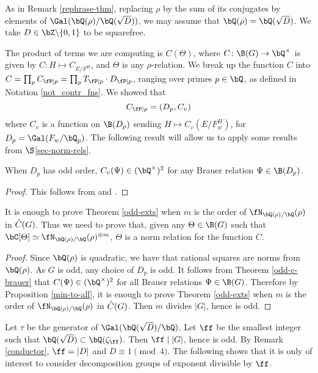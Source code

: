 As in Remark \ref{rephrase-thm}, replacing $\rho$ by the sum of its conjugates by elements of $ \Gal(\bQ(\rho) / \bQ(\sqrt{D}))$, we may assume that $\bQ(\rho) = \bQ(\sqrt{D})$. We take $D \in \bZ \backslash \{0,1 \}$ to be squarefree.

The product of terms we are computing is $C(\Theta)$, where $C \colon \B(G) \to \bQ^{\times}$ is given by $C \colon H \mapsto C_{E / F^H}$, and $\Theta$ is any $\rho$-relation.
We break up the function $C$ into $C = \prod_p C_{\fP \mid p} = \prod_p T_{\fP \mid p} \cdot D_{\fP \mid p}$, ranging over primes $p \in \bQ$,
as defined in Notation \ref{not_contr_fns}.
We showed that
\begin{equation*}\label{Dp-loc}
C_{\fP \mid p} = (D_p, C_v)
\end{equation*}
where $C_v$ is a function on $\B(D_p)$ sending $H \mapsto C_v(E / F_w^H)$, for $D_p = \Gal(F_w / \bQ_p)$. The following result will allow us to apply some results from $\S$\ref{sec-norm-rels}.

\begin{thm}\label{odd-c-brauer}
    When $D_p$ has odd order, $C_v(\Psi) \in (\bQ^{\times})^2$ for any Brauer relation $\Psi \in \B(D_p)$. 
\end{thm}

\begin{proof}
    This follows from \cite[Theorem 2.47]{reg-const} and \cite[Theorem 3.2  (Tam)]{reg-const}.
\end{proof}

\begin{cor}
It is enough to prove Theorem \ref{odd-exts} when $m$ is the order of $\repnorm{\rho}$ in $\hat{C}(G)$. Thus we need to prove that, given any $
\Theta \in \B(G)$ such that $\bC[\Theta] \simeq \repnorm{\rho}^{\oplus m}$, $\Theta$ is a norm relation for the function $C$. 
\end{cor}

\begin{proof}
    Since $\bQ(\rho)$ is quadratic, we have that rational squares are norms from $\bQ(\rho)$. As $G$ is odd, any choice of $D_p$ is odd. It follows from Theorem \ref{odd-c-brauer} that $C(\Psi) \in (\bQ^{\times})^2$ for all Brauer relations $\Psi \in \B(G)$. Therefore by Proposition \ref{min-to-all}, it is enough to prove Theorem \ref{odd-exts} when $m$ is the order of $\repnorm{\rho}$ in $\hat{C}(G)$. Then $m$ divides $|G|$, hence is odd.
\end{proof}

Let $\tau$ be the generator of $\Gal(\bQ(\sqrt{D}) / \bQ)$.
Let $\ff$ be the smallest integer such that $\bQ(\sqrt{D}) \subset \bQ(\zeta_{\ff})$. Then $\ff \mid |G|$, hence is odd. By Remark \ref{conductor}, $\ff = |D|$ and $D \equiv 1 \pmod 4$. The following shows that it is only of interest to consider decomposition groups of exponent divisible by $\ff$.

